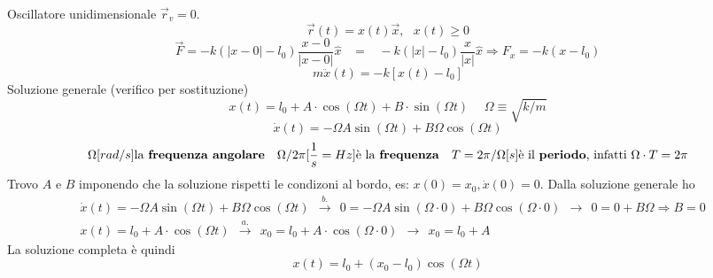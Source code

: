 \begin{example}
    Oscillatore unidimensionale $\vec{r}_v = 0$.
    $$\vec{r}(t) = x(t)\vec{x}, \:\:\:x(t)\geq 0$$
    $$\vec{F}= -k(|x-0| - l_0)\frac{x - 0}{|x - 0|}\hat{x} \hspace{10pt} = \hspace{10pt} -k(|x| - l_0)\frac{x}{|x|}\hat{x} \Rightarrow F_x = -k(x-l_0)$$
    $$m\ddot{x}(t) = -k[x(t) - l_0]$$
    Soluzione generale (verifico per sostituzione)
    $$x(t) = l_0 + A \cdot \cos(\Omega t) + B \cdot \sin(\Omega t) \hspace{15pt} \Omega \equiv \sqrt{k/m}$$
    $$\dot{x}(t) = -\Omega A \sin(\Omega t) + B \Omega \cos(\Omega t)$$
    $$\Omega[rad/s] \text{la \textbf{frequenza angolare}} \hspace{10pt} \Omega/2\pi [\frac{1}{s} = Hz] \text{è la \textbf{frequenza}} \hspace{10pt} T = 2\pi/\Omega [s] \text{è il \textbf{periodo}, infatti } \Omega \cdot T = 2\pi$$ 
    Trovo $A$ e $B$ imponendo che la soluzione rispetti le condizoni al bordo, es: $x(0) = x_0, \dot{x}(0) = 0$. 
    Dalla soluzione generale ho 
    \begin{align*}
        & \dot{x}(t) = -\Omega A \sin(\Omega t) + B \Omega \cos(\Omega t) \:\: \xrightarrow{b.} \:\: 0 = -\Omega A \sin(\Omega \cdot 0) + B \Omega \cos(\Omega \cdot 0) \:\:\rightarrow\:\: 0 = 0 + B\Omega \Rightarrow B = 0\\
        & x(t) = l_0 + A \cdot \cos(\Omega t) \:\:\xrightarrow{a.}\:\: x_0 = l_0 + A \cdot \cos(\Omega \cdot 0) \:\:\rightarrow\:\: x_0 = l_0 + A
    \end{align*}
    La soluzione completa è quindi
    $$x(t) = l_0 + (x_0 - l_0) \cos(\Omega t)$$
\end{example}

